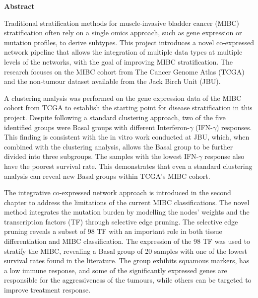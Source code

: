 \thispagestyle{plain}
\begin{center}
    \Large        
    \textbf{Abstract}
    \vspace{0.2cm}
\end{center}


Traditional stratification methods for muscle-invasive bladder cancer (MIBC) stratification often rely on a single omics approach, such as gene expression or mutation profiles, to derive subtypes. This project introduces a novel co-expressed network pipeline that allows the integration of multiple data types at multiple levels of the networks, with the goal of improving MIBC stratification. The research focuses on the MIBC cohort from The Cancer Genome Atlas (TCGA) and the non-tumour dataset available from the Jack Birch Unit (JBU).

A clustering analysis was performed on the gene expression data of the MIBC cohort from TCGA to establish the starting point for disease stratification in this project. Despite following a standard clustering approach, two of the five identified groups were Basal groups with different Interferon-$\gamma$ (IFN-$\gamma$) responses. This finding is consistent with the in vitro work conducted at JBU, which, when combined with the clustering analysis, allows the Basal group to be further divided into three subgroups. The samples with the lowest IFN-$\gamma$ response also have the poorest survival rate. This demonstrates that even a standard clustering analysis can reveal new Basal groups within TCGA's MIBC cohort.


% 
The integrative co-expressed network approach is introduced in the second chapter to address the limitations of the current MIBC classifications. The novel method integrates the mutation burden by modelling the nodes' weights and the transcription factors (TF) through selective edge pruning. The selective edge pruning reveals a subset of 98 TF with an important role in both tissue differentiation and MIBC classification. The expression of the 98 TF was used to stratify the MIBC, revealing a Basal group of 20 samples with one of the lowest survival rates found in the literature. The group exhibits squamous markers, has a low immune response, and some of the significantly expressed genes are responsible for the aggressiveness of the tumours, while others can be targeted to improve treatment response.

